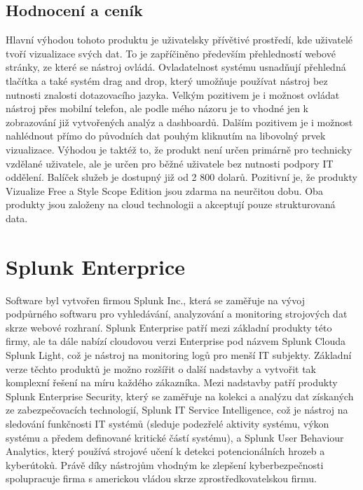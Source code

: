 \documentclass[czech,BP]{thesiskiv}
\begin{document}
\subsection{Hodnocení a ceník}
Hlavní výhodou tohoto produktu je uživatelsky přívětivé prostředí, kde uživatelé tvoří vizualizace svých dat. To je zapříčiněno především přehledností webové stránky, ze které se nástroj ovládá. Ovladatelnost systému usnadňují přehledná tlačítka a také systém drag and drop, který umožňuje používat nástroj bez nutnosti znalosti dotazovacího jazyka. Velkým pozitivem je i možnost ovládat nástroj přes mobilní telefon, ale podle mého názoru je to vhodné jen k zobrazování již vytvořených analýz a dashboardů. Dalším pozitivem je i možnost nahlédnout přímo do původních dat pouhým kliknutím na libovolný prvek vizualizace. Výhodou je taktéž to, že produkt není určen primárně pro technicky vzdělané uživatele, ale je určen pro běžné uživatele bez nutnosti podpory IT oddělení. Balíček služeb je dostupný již od 2 800 dolarů.\cite{InetCenik} Pozitivní je, že produkty Vizualize Free a Style Scope Edition jsou zdarma na neurčitou dobu. Oba produkty jsou založeny na cloud technologii a akceptují pouze strukturovaná data.


\section{Splunk Enterprice}
Software byl vytvořen firmou Splunk Inc., která se zaměřuje na vývoj podpůrného softwaru pro vyhledávání, analyzování a monitoring strojových dat skrze webové rozhraní.\cite{Splunk_a_kompatibilita} Splunk Enterprise patří mezi základní produkty této firmy, ale ta dále nabízí cloudovou verzi Enterprise pod názvem Splunk Cloud\texttrademark a Splunk Light, což je nástroj na monitoring logů pro menší IT subjekty. Základní verze těchto produktů je možno rozšířit o další nadstavby a vytvořit tak komplexní řešení na míru každého zákazníka. Mezi nadstavby patří produkty Splunk Enterprise Security, který se zaměřuje na kolekci a analýzu dat získaných ze zabezpečovacích technologií, Splunk IT Service Intelligence, což je nástroj na sledování funkčnosti IT systémů (sleduje podezřelé aktivity systému, výkon systému a předem definované kritické částí systému), a Splunk User Behaviour Analytics, který používá strojové učení k detekci potencionálních hrozeb a kyberútoků. Právě díky nástrojům vhodným ke zlepšení kyberbezpečnosti spolupracuje firma s americkou vládou skrze zprostředkovatelskou firmu.\cite{Splunk_security}
\end{document}
